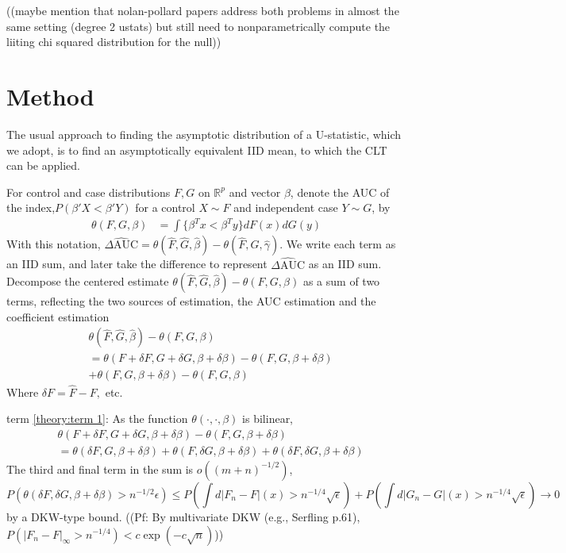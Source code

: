 \documentclass[12pt]{article}
\renewcommand{\P}{P}
\renewcommand{\t}[1]{{#1}^T}
\newcommand{\F}{F}
\newcommand{\G}{G}
\newcommand{\N}{m+n}
\newcommand{\auc}{\theta}
\newcommand{\aucdiffhat}{\hat{\Delta\text{AUC}}}
\newcommand{\kernel}[2]{\{#1 < #2\}}
\theoremstyle{definition}
\begin{document}
((maybe mention that nolan-pollard papers address both problems in
almost the same setting (degree 2 ustats) but still need to
nonparametrically compute the liiting chi squared distribution for the
null))

\section{Method}


The usual approach to finding the asymptotic distribution of
a U-statistic, which we adopt, is to find an asymptotically equivalent IID mean, to which
the CLT can be applied.


For control and case distributions $F,G$ on $\mathbb{R}^p$ and vector $\beta$, denote the AUC of the index,$P(\beta' X<\beta' Y)$ for a control $X\sim F$ and independent case $Y\sim G$, by
\begin{align}
  \auc(F,G,\beta) &= \int\kernel{\t\beta x}{\t\beta y}dF(x)dG(y)
\end{align}
With this notation,
$\aucdiffhat=\auc(\hat\F,\hat\G,\hat\beta)-\auc(\hat\F,\hat\G,\hat\gamma)$.
We write each term as an IID sum, and later take the difference to
represent $\aucdiffhat$ as an IID sum. Decompose the centered estimate
$\auc(\hat\F,\hat\G,\hat\beta)- \auc(\F,\G,\beta)$ as a sum of two
terms, reflecting the two sources of estimation, the AUC estimation
and the coefficient
estimation%
\begin{align}
  &\auc(\hat\F,\hat\G,\hat\beta) - \auc(\F,\G,\beta)\\
  &=\auc(\F+\delta\F,\G+\delta\G,\beta+\delta\beta) - \auc(\F,\G,\beta+\delta\beta) \label{theory:term 1}\\
    &+ \auc(\F,\G,\beta+\delta\beta)-\auc(\F,\G,\beta)\label{theory:term 2}
\end{align}
Where $\delta\F=\hat\F-\F,$ etc.

term \eqref{theory:term 1}: As the function $\auc(\cdot,\cdot,\beta)$ is bilinear,
\begin{align}
  &\auc(\F+\delta\F,\G+\delta\G,\beta+\delta\beta) - \auc(\F,\G,\beta+\delta\beta)\\
  &=\auc(\delta\F,\G,\beta+\delta\beta)+\auc(\F,\delta\G,\beta+\delta\beta)+\theta(\delta\F,\delta\G,\beta+\delta\beta)
\end{align}
The third and final term in the sum is $o((\N)^{-1/2})$, %
$$
\P(\theta(\delta\F,\delta\G,\beta+\delta\beta)>n^{-1/2}\epsilon) \le \P(\int d|\F_n-\F|(x) > n^{-1/4}\sqrt\epsilon)+\P(\int d|\G_n-\G|(x) > n^{-1/4}\sqrt\epsilon)\to 0
$$
by a DKW-type bound.
((Pf: By multivariate DKW (e.g., Serfling p.61), $\P(|\F_n-\F|_\infty > n^{-1/4})<c\exp(-c\sqrt n)$))
\end{document}
